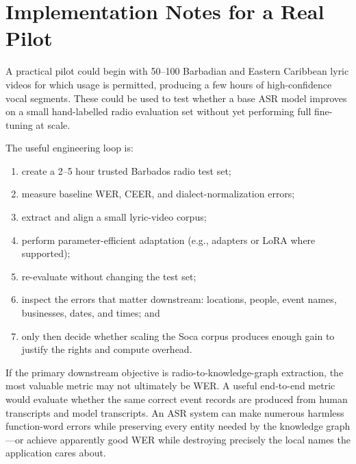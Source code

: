 \documentclass[10pt,twocolumn]{article}
\begin{document}
\section{Implementation Notes for a Real Pilot}
A practical pilot could begin with 50--100 Barbadian and Eastern Caribbean lyric videos for which usage is permitted, producing a few hours of high-confidence vocal segments. These could be used to test whether a base ASR model improves on a small hand-labelled radio evaluation set without yet performing full fine-tuning at scale.

The useful engineering loop is:
\begin{enumerate}
\item create a 2--5 hour trusted Barbados radio test set;
\item measure baseline WER, CEER, and dialect-normalization errors;
\item extract and align a small lyric-video corpus;
\item perform parameter-efficient adaptation (e.g., adapters or LoRA where supported);
\item re-evaluate without changing the test set;
\item inspect the errors that matter downstream: locations, people, event names, businesses, dates, and times; and
\item only then decide whether scaling the Soca corpus produces enough gain to justify the rights and compute overhead.
\end{enumerate}

If the primary downstream objective is radio-to-knowledge-graph extraction, the most valuable metric may not ultimately be WER. A useful end-to-end metric would evaluate whether the same correct event records are produced from human transcripts and model transcripts. An ASR system can make numerous harmless function-word errors while preserving every entity needed by the knowledge graph---or achieve apparently good WER while destroying precisely the local names the application cares about.
\end{document}
